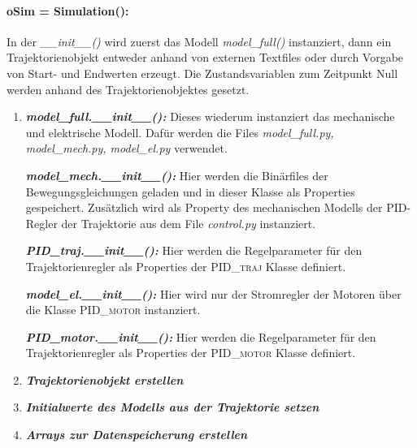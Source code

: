 \documentclass[10pt,a4paper]{article}
\newcommand{\tfcn}[1]{\textit{\textbf{#1}}}
\newcommand{\cbox}[1]{\colorbox{green!50!black!30}{#1}}
\begin{document}
		\paragraph{\cbox{oSim = Simulation():}}
		 In der \textit{\_\_init\_\_()} wird zuerst das Modell \textit{model\_full()} instanziert, dann ein Trajektorienobjekt entweder anhand von externen Textfiles oder durch Vorgabe von Start- und Endwerten erzeugt. Die Zustandsvariablen zum Zeitpunkt Null werden anhand des Trajektorienobjektes gesetzt. 
		 \begin{enumerate}
		 	\item \tfcn{model\_full.\_\_init\_\_():} Dieses wiederum instanziert das mechanische und elektrische Modell. Dafür werden die Files \textit{model\_full.py, model\_mech.py, model\_el.py} verwendet. 
		 	\begin{adjustwidth}{1cm}{}
		 		\tfcn{model\_mech.\_\_init\_\_():} Hier werden die Binärfiles der Bewegungsgleichungen geladen und in dieser Klasse als Properties gespeichert. Zusätzlich wird als Property des mechanischen Modells der PID-Regler der Trajektorie aus dem File \textit{control.py} instanziert.
		 		\begin{adjustwidth}{1cm}{}
		 			\tfcn{PID\_traj.\_\_init\_\_():} Hier werden die Regelparameter für den Trajektorienregler als Properties der \textsc{PID\_traj} Klasse definiert.
		 		\end{adjustwidth}
		 	\end{adjustwidth}
	 		\begin{adjustwidth}{1cm}{}
	 			\tfcn{model\_el.\_\_init\_\_():} Hier wird nur der Stromregler der Motoren über die Klasse \textsc{PID\_motor} instanziert.
	 			\begin{adjustwidth}{1cm}{}
	 				\tfcn{PID\_motor.\_\_init\_\_():} Hier werden die Regelparameter für den Trajektorienregler als Properties der \textsc{PID\_motor} Klasse definiert.
	 			\end{adjustwidth}
	 		\end{adjustwidth}
 			\item \tfcn{Trajektorienobjekt erstellen}\\
 			\item\tfcn{Initialwerte des Modells aus der Trajektorie setzen}\\
 			\item\tfcn{Arrays zur Datenspeicherung erstellen}
		 \end{enumerate}
		 
\end{document}
